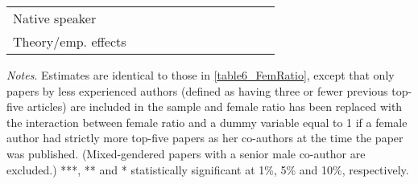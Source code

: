 \begin{sidewaystable}
\begin{threeparttable}
\begin{tabular}{p{3cm}S@{}S@{}S@{}S@{}S@{}S@{}S@{}S@{}S@{}S@{}S@{}}
            Native speaker                &               &           {}   &               &           {}   &               &           {}   &               &           {}   &               &               &               \\
            Theory/emp. effects           &               &           {}   &               &           {}   &               &           {}   &               &           {}   &               &               &               \\
            \bottomrule
        \end{tabular}
        \begin{tablenotes}
            \tiny
            \item \textit{Notes}. Estimates are identical to those in \autoref{table6_FemRatio}, except that only papers by less experienced authors (defined as having three or fewer previous top-five articles) are included in the sample and female ratio has been replaced with the interaction between female ratio and a dummy variable equal to 1 if a female author had strictly more top-five papers as her co-authors at the time the paper was published. (Mixed-gendered papers with a senior male co-author are excluded.) ***, ** and * statistically significant at 1\%, 5\% and 10\%, respectively.
        \end{tablenotes}
    \end{threeparttable}

\end{sidewaystable}
